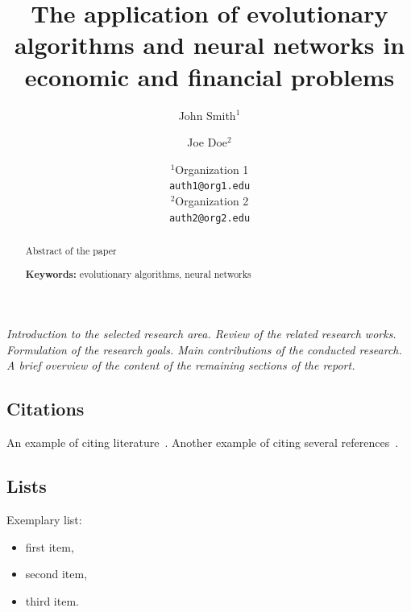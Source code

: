 \documentclass[english]{projectreport}
\author{John Smith$^1$ \and Joe Doe$^2$}
\title{The application of evolutionary algorithms and neural networks in economic and financial problems}
\date{
	{\small $^1$Organization 1 \\ \texttt{auth1@org1.edu}\\[1ex]%
	$^2$Organization 2 \\ \texttt{auth2@org2.edu}\\[2ex]%
        \the\year}
      }
\begin{document}
\maketitle

\thispagestyle{empty}

\begin{abstract}
\noindent Abstract of the paper
  
\noindent\textbf{Keywords:} evolutionary algorithms, neural networks
\end{abstract}

\section{\SectionTitleIntroduction}
\label{sec:introduction}


\emph{Introduction to the selected research area. Review of the related research works. Formulation of the research goals. Main contributions of the conducted research. A brief overview of the content of the remaining sections of the report.}

\subsection{Citations}
\label{sec:citations}

An example of citing literature~\cite{chmaj2015DistributedProcessingApplications}. Another example of citing several references~\cite{wilson2009prediction-interday, allen1999using-genetic, zitzler1999evolutionary-algorithms, pictet1995genetic-algorithms, wilhelmstotter2021jenetics}.

\subsection{Lists}
\label{sec:lists}

Exemplary list:
\begin{itemize}
\item first item,
\item second item,
\item third item.
\end{itemize}
\end{document}
